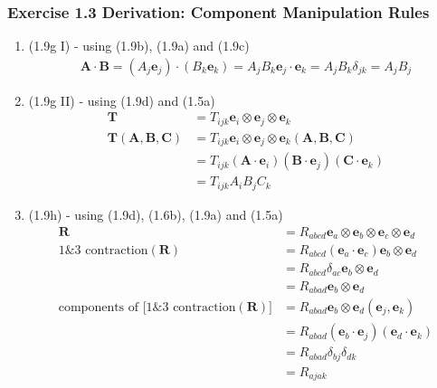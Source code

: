 \documentclass[10pt,a4paper]{book}
\theoremstyle{definition}
\begin{document}
\subsubsection{Exercise 1.3 Derivation: Component Manipulation Rules}
\begin{enumerate}
\item (1.9g I) - using (1.9b), (1.9a) and (1.9c)
\begin{align}
    \mathbf{A}\cdot\mathbf{B}
    =(A_j\mathbf{e}_j)\cdot(B_k\mathbf{e}_k)
    =A_jB_k\mathbf{e}_j\cdot\mathbf{e}_k
    =A_jB_k\delta_{jk}
    =A_jB_j
\end{align}
\item (1.9g II) - using (1.9d) and (1.5a)
\begin{align}
    \mathbf{T}&=T_{ijk}\mathbf{e}_i\otimes\mathbf{e}_j\otimes\mathbf{e}_k\\
    \mathbf{T}(\mathbf{A},\mathbf{B},\mathbf{C})
    &=T_{ijk}\mathbf{e}_i\otimes\mathbf{e}_j\otimes\mathbf{e}_k(\mathbf{A},\mathbf{B},\mathbf{C})\\
    &=T_{ijk}(\mathbf{A}\cdot\mathbf{e}_i)(\mathbf{B}\cdot\mathbf{e}_j)(\mathbf{C}\cdot\mathbf{e}_k)\\
    &=T_{ijk}A_iB_jC_k
\end{align}
\item (1.9h) - using (1.9d), (1.6b), (1.9a) and (1.5a)
\begin{align}
    \mathbf{R}
    &=R_{abcd}\mathbf{e}_a\otimes\mathbf{e}_b\otimes\mathbf{e}_c\otimes\mathbf{e}_d\\
    \text{1\&3 contraction}(\mathbf{R})
    &=R_{abcd}(\mathbf{e}_a\cdot\mathbf{e}_c) \mathbf{e}_b\otimes\mathbf{e}_d\\
    &=R_{abcd}\delta_{ac} \mathbf{e}_b\otimes\mathbf{e}_d\\
    &=R_{abad}\mathbf{e}_b\otimes\mathbf{e}_d\\
    \text{components of [1\&3 contraction}(\mathbf{R})]&=R_{abad}\mathbf{e}_b\otimes\mathbf{e}_d(\mathbf{e}_j,\mathbf{e}_k)\\
    &=R_{abad}(\mathbf{e}_b\cdot\mathbf{e}_j)(\mathbf{e}_d\cdot\mathbf{e}_k)\\
    &=R_{abad}\delta_{bj}\delta_{dk}\\
    &=R_{ajak}
\end{align}
\end{enumerate}
\end{document}
